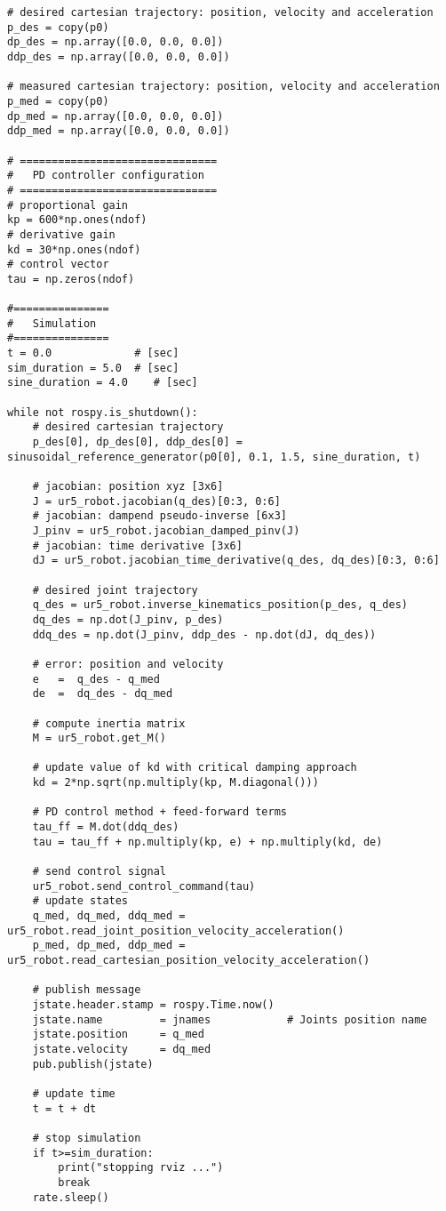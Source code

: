 \begin{lstlisting}
# desired cartesian trajectory: position, velocity and acceleration
p_des = copy(p0)
dp_des = np.array([0.0, 0.0, 0.0])
ddp_des = np.array([0.0, 0.0, 0.0])

# measured cartesian trajectory: position, velocity and acceleration
p_med = copy(p0)
dp_med = np.array([0.0, 0.0, 0.0])
ddp_med = np.array([0.0, 0.0, 0.0])

# ===============================
#   PD controller configuration
# ===============================
# proportional gain
kp = 600*np.ones(ndof)
# derivative gain
kd = 30*np.ones(ndof)
# control vector
tau = np.zeros(ndof)    

#===============
#   Simulation
#===============
t = 0.0             # [sec] 
sim_duration = 5.0  # [sec]
sine_duration = 4.0    # [sec]

while not rospy.is_shutdown():
    # desired cartesian trajectory
    p_des[0], dp_des[0], ddp_des[0] = sinusoidal_reference_generator(p0[0], 0.1, 1.5, sine_duration, t)

    # jacobian: position xyz [3x6]
    J = ur5_robot.jacobian(q_des)[0:3, 0:6] 
    # jacobian: dampend pseudo-inverse [6x3] 
    J_pinv = ur5_robot.jacobian_damped_pinv(J)
    # jacobian: time derivative [3x6]
    dJ = ur5_robot.jacobian_time_derivative(q_des, dq_des)[0:3, 0:6]
    
    # desired joint trajectory
    q_des = ur5_robot.inverse_kinematics_position(p_des, q_des)
    dq_des = np.dot(J_pinv, p_des)
    ddq_des = np.dot(J_pinv, ddp_des - np.dot(dJ, dq_des))

    # error: position and velocity
    e 	=  q_des - q_med
    de 	=  dq_des - dq_med    

    # compute inertia matrix
    M = ur5_robot.get_M()

    # update value of kd with critical damping approach
    kd = 2*np.sqrt(np.multiply(kp, M.diagonal()))

    # PD control method + feed-forward terms
    tau_ff = M.dot(ddq_des)
    tau = tau_ff + np.multiply(kp, e) + np.multiply(kd, de)
    
    # send control signal
    ur5_robot.send_control_command(tau)
    # update states
    q_med, dq_med, ddq_med = ur5_robot.read_joint_position_velocity_acceleration()
    p_med, dp_med, ddp_med = ur5_robot.read_cartesian_position_velocity_acceleration()

    # publish message
    jstate.header.stamp = rospy.Time.now()
    jstate.name 		= jnames			# Joints position name
    jstate.position 	= q_med
    jstate.velocity 	= dq_med
    pub.publish(jstate)

    # update time
    t = t + dt
    
    # stop simulation
    if t>=sim_duration:
        print("stopping rviz ...")
        break
    rate.sleep()
\end{lstlisting}

